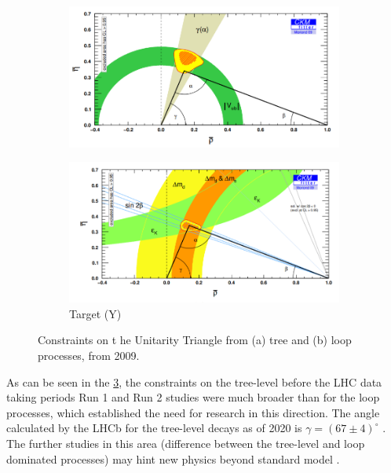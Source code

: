 \begin{figure}[H]
\centering
\begin{subfigure}[b]{0.65\textwidth}
    \centering
    \includegraphics[width=\linewidth]{figures/chapter1/lhcb_goals_a.png}
\caption{}
   \label{plot:plot_triangle_a}
  \end{subfigure}
\begin{subfigure}[b]{0.65\textwidth}
    \centering
    \includegraphics[width=\linewidth]{figures/chapter1/lhcb_goals_b.png}
\caption{Target (Y)}
   \label{plot:plot_triangle_b}
  \end{subfigure}
  \caption[Triangle constraints]{Constraints on t
  he Unitarity Triangle from (a) tree and (b) loop processes, from 2009.}
    \label{plot:both_triangles}
\end{figure}

As can be seen in the \ref{plot:both_triangles}, the constraints on the tree-level before the LHC data taking periods \cite{thelhcbcollaboration2010roadmap} Run 1 and Run 2 studies were much broader than for the loop processes, which established the need for research in this direction.
The angle calculated by the LHCb for the tree-level decays as of 2020 is $γ = (67 \pm 4)^{\circ}$ \cite{LHCb-CONF-2020-003}.
The further studies in this area (difference between the tree-level and loop dominated processes) may hint new physics beyond standard model \cite{Krupa:2314451,}.


